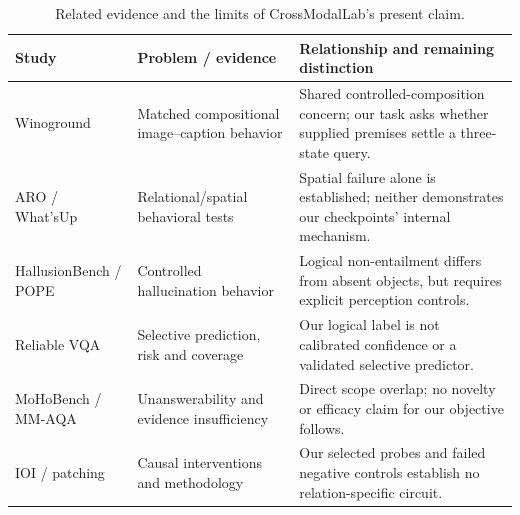 \begin{table}[t]\centering\small
\caption{Related evidence and the limits of CrossModalLab's present claim.}
\begin{tabular}{p{}p{}p{}}\hline
Study & Problem / evidence & Relationship and remaining distinction \\ \hline
Winoground~\cite{W1} & Matched compositional image--caption behavior & Shared controlled-composition concern; our task asks whether supplied premises settle a three-state query. \\
ARO / What'sUp~\cite{W18,W2} & Relational/spatial behavioral tests & Spatial failure alone is established; neither demonstrates our checkpoints' internal mechanism. \\
HallusionBench / POPE~\cite{W19,W3} & Controlled hallucination behavior & Logical non-entailment differs from absent objects, but requires explicit perception controls. \\
Reliable VQA~\cite{W5} & Selective prediction, risk and coverage & Our logical label is not calibrated confidence or a validated selective predictor. \\
MoHoBench / MM-AQA~\cite{W20,W16} & Unanswerability and evidence insufficiency & Direct scope overlap; no novelty or efficacy claim for our objective follows. \\
IOI / patching~\cite{W6,W7} & Causal interventions and methodology & Our selected probes and failed negative controls establish no relation-specific circuit. \\ \hline
\end{tabular}\end{table}
